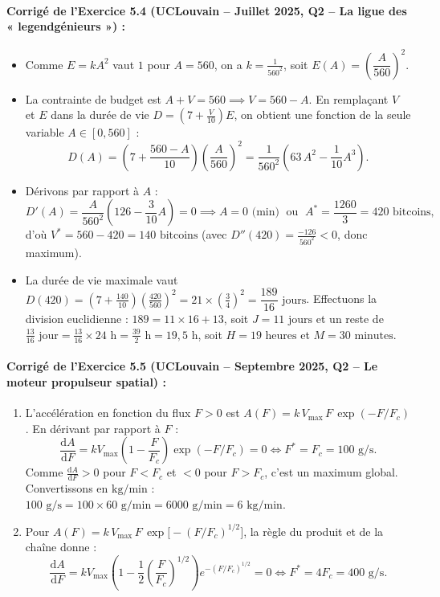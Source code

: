 \paragraph{Corrigé de l'Exercice 5.4 (UCLouvain -- Juillet 2025, Q2 -- La ligue des « legendgénieurs ») :}
\begin{itemize}
    \item Comme $E = kA^2$ vaut $1$ pour $A = 560$, on a $k = \frac{1}{560^2}$, soit $E(A) = \left(\dfrac{A}{560}\right)^2$.
    \item La contrainte de budget est $A + V = 560 \implies V = 560 - A$. En remplaçant $V$ et $E$ dans la durée de vie $D = \left(7 + \frac{V}{10}\right)E$, on obtient une fonction de la seule variable $A \in [0, 560]$ :
    \[
        D(A) = \left(7 + \frac{560 - A}{10}\right)\left(\frac{A}{560}\right)^2 = \frac{1}{560^2}\left(63\,A^2 - \frac{1}{10}A^3\right).
    \]
    \item Dérivons par rapport à $A$ :
    \[
        D'(A) = \frac{A}{560^2}\left(126 - \frac{3}{10}A\right) = 0 \implies A = 0 \text{ (min)} \;\text{ ou }\; \boxed{A^* = \frac{1260}{3} = 420\text{ bitcoins}},
    \]
    d'où $\boxed{V^* = 560 - 420 = 140\text{ bitcoins}}$ (avec $D''(420) = \frac{-126}{560^2} < 0$, donc maximum).
    \item La durée de vie maximale vaut $D(420) = \left(7 + \frac{140}{10}\right)\left(\frac{420}{560}\right)^2 = 21 \times \left(\frac{3}{4}\right)^2 = \boxed{\dfrac{189}{16}\text{ jours}}$.
    Effectuons la division euclidienne : $189 = 11 \times 16 + 13$, soit $\boxed{J = 11\text{ jours}}$ et un reste de $\frac{13}{16}\text{ jour} = \frac{13}{16} \times 24\text{ h} = \frac{39}{2}\text{ h} = 19,5\text{ h}$, soit $\boxed{H = 19\text{ heures}}$ et $\boxed{M = 30\text{ minutes}}$.
\end{itemize}

\paragraph{Corrigé de l'Exercice 5.5 (UCLouvain -- Septembre 2025, Q2 -- Le moteur propulseur spatial) :}
\begin{enumerate}[label=(\alph*)]
    \item L'accélération en fonction du flux $F > 0$ est $A(F) = k\,V_{\max}\,F\,\exp(-F/F_c)$. En dérivant par rapport à $F$ :
    \[
        \frac{\mathrm{d}A}{\mathrm{d}F} = k V_{\max}\left(1 - \frac{F}{F_c}\right)\exp(-F/F_c) = 0 \iff \boxed{F^* = F_c = 100\text{ g/s}}.
    \]
    Comme $\frac{\mathrm{d}A}{\mathrm{d}F} > 0$ pour $F < F_c$ et $< 0$ pour $F > F_c$, c'est un maximum global. Convertissons en $\text{kg/min}$ : $100\text{ g/s} = 100 \times 60\text{ g/min} = 6000\text{ g/min} = \boxed{6\text{ kg/min}}$.
    \item Pour $A(F) = k\,V_{\max}\,F\,\exp\bigl[-(F/F_c)^{1/2}\bigr]$, la règle du produit et de la chaîne donne :
    \[
        \frac{\mathrm{d}A}{\mathrm{d}F} = k V_{\max}\left(1 - \frac{1}{2}\left(\frac{F}{F_c}\right)^{1/2}\right)e^{-(F/F_c)^{1/2}} = 0 \iff \boxed{F^* = 4F_c = 400\text{ g/s}}.
    \]
\end{enumerate}

